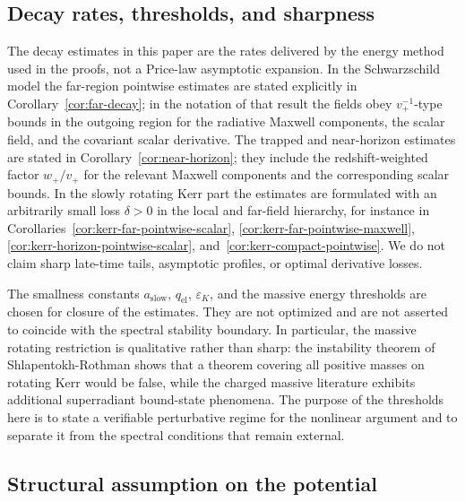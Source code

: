 \documentclass[11pt]{article}
\numberwithin{equation}{section}
\theoremstyle{plain}
\theoremstyle{definition}
\theoremstyle{remark}
\begin{document}
\subsection{Decay rates, thresholds, and sharpness}\label{subsec:sharpness-thresholds}

The decay estimates in this paper are the rates delivered by the energy method used in the proofs, not a Price-law asymptotic expansion.  In the Schwarzschild model the far-region pointwise estimates are stated explicitly in Corollary~\ref{cor:far-decay}; in the notation of that result the fields obey \(v_+^{-1}\)-type bounds in the outgoing region for the radiative Maxwell components, the scalar field, and the covariant scalar derivative.  The trapped and near-horizon estimates are stated in Corollary~\ref{cor:near-horizon}; they include the redshift-weighted factor \(w_+/v_+\) for the relevant Maxwell components and the corresponding scalar bounds.  In the slowly rotating Kerr part the estimates are formulated with an arbitrarily small loss \(\delta>0\) in the local and far-field hierarchy, for instance in Corollaries~\ref{cor:kerr-far-pointwise-scalar}, \ref{cor:kerr-far-pointwise-maxwell}, \ref{cor:kerr-horizon-pointwise-scalar}, and~\ref{cor:kerr-compact-pointwise}.  We do not claim sharp late-time tails, asymptotic profiles, or optimal derivative losses.

The smallness constants \(a_{\mathrm{slow}}\), \(q_{\mathrm{el}}\), \(\varepsilon_K\), and the massive energy thresholds are chosen for closure of the estimates.  They are not optimized and are not asserted to coincide with the spectral stability boundary.  In particular, the massive rotating restriction is qualitative rather than sharp: the instability theorem of Shlapentokh-Rothman shows that a theorem covering all positive masses on rotating Kerr would be false, while the charged massive literature exhibits additional superradiant bound-state phenomena.  The purpose of the thresholds here is to state a verifiable perturbative regime for the nonlinear argument and to separate it from the spectral conditions that remain external.

\subsection{Structural assumption on the potential}
\end{document}

